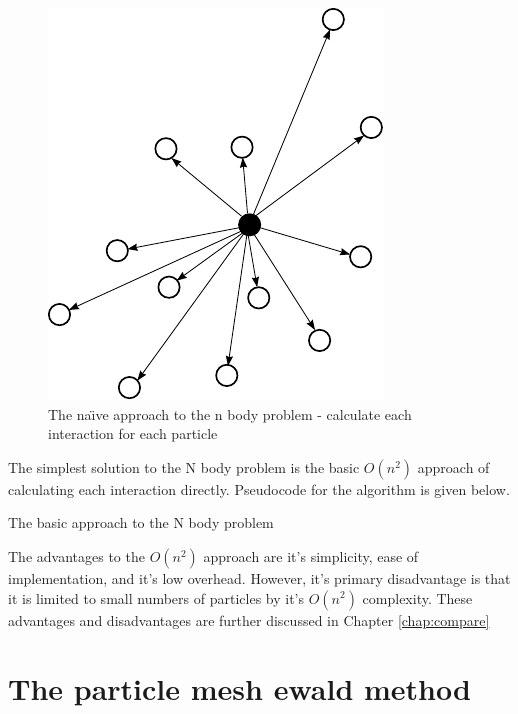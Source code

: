 \documentclass[pdftex,twoside,a4paper]{report}
\newcommand{\bcen}{\begin{center}}
\newcommand{\ecen}{\end{center}}
\begin{document}
\begin{figure}[H]
\bcen \includegraphics{figures/nbodies.pdf} \ecen
\caption{The na\"{\i}ve approach to the n body problem - calculate each interaction for each particle}
\end{figure}

The simplest solution to the N body problem is the basic $O(n^2)$ approach of calculating each interaction directly. Pseudocode for the algorithm is given below.\\

\begin{algorithm}[H]
 \SetLine
 \caption{The basic approach to the N body problem}
\end{algorithm}

The advantages to the $O(n^2)$ approach are it's simplicity, ease of implementation, and it's low overhead. However, it's primary disadvantage is that it is limited to small numbers of particles by it's $O(n^2)$ complexity. These advantages and disadvantages are further discussed in Chapter \ref{chap:compare}

\section{The particle mesh ewald method}
\end{document}
